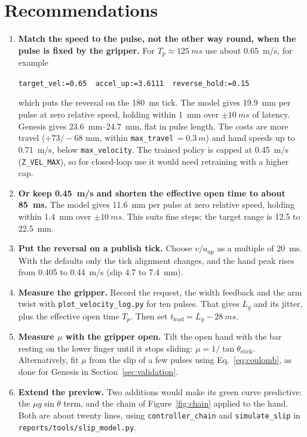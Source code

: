 \documentclass[10.5pt,a4paper]{article}
\newcommand{\code}[1]{\texttt{#1}}
\begin{document}
\section{Recommendations}
\begin{enumerate}
\item \textbf{Match the speed to the pulse, not the other way round, when the pulse is fixed by the gripper.}
For $T_p\approx\SI{125}{ms}$ use about \SI{0.65}{m/s}, for example
\begin{center}\code{target\_vel:=0.65\ \ accel\_up:=3.6111\ \ reverse\_hold:=0.15}\end{center}
which puts the reversal on the \SI{180}{ms} tick. The model gives
\SI{19.9}{mm} per pulse at zero relative speed, holding within \SI{1}{mm} over $\pm\SI{10}{ms}$ of latency.
Genesis gives \SIrange{23.6}{24.7}{mm}, flat in pulse length. The costs are more travel ($+73/-68$ mm, within
\code{max\_travel}\,$=\SI{0.3}{m}$) and hand speeds up to \SI{0.71}{m/s}, below \code{max\_velocity}. The trained
policy is capped at \SI{0.45}{m/s} (\code{Z\_VEL\_MAX}), so for closed-loop use it would need retraining with a
higher cap.
\item \textbf{Or keep \SI{0.45}{m/s} and shorten the effective open time to about \SI{85}{ms}.} The model gives
\SI{11.6}{mm} per pulse at zero relative speed, holding within \SI{1.4}{mm} over $\pm\SI{10}{ms}$. This suits
fine steps; the target range is 12.5 to \SI{22.5}{mm}.
\item \textbf{Put the reversal on a publish tick.} Choose $v/a_{\text{up}}$ as a multiple of \SI{20}{ms}. With
the defaults only the tick alignment changes, and the hand peak rises from 0.405 to \SI{0.44}{m/s} (slip 4.7 to
\SI{7.4}{mm}).
\item \textbf{Measure the gripper.} Record the request, the width feedback and the arm twist with
\code{plot\_velocity\_log.py} for ten pulses. That gives $L_g$ and its jitter, plus the effective open time
$T_p$. Then set $t_{\text{lead}}=L_g-\SI{28}{ms}$.
\item \textbf{Measure $\mu$ with the gripper open.} Tilt the open hand with the bar resting on the lower finger
until it stops sliding: $\mu=1/\tan\theta_{\text{stick}}$. Alternatively, fit $\mu$ from the slip of a few
pulses using Eq.~\eqref{eq:coulomb}, as done for Genesis in Section~\ref{sec:validation}.
\item \textbf{Extend the preview.} Two additions would make its green curve predictive: the $\mu g\sin\theta$
term, and the chain of Figure~\ref{fig:chain} applied to the hand. Both are about twenty lines, using
\code{controller\_chain} and \code{simulate\_slip} in \code{reports/tools/slip\_model.py}.
\end{enumerate}
\end{document}
